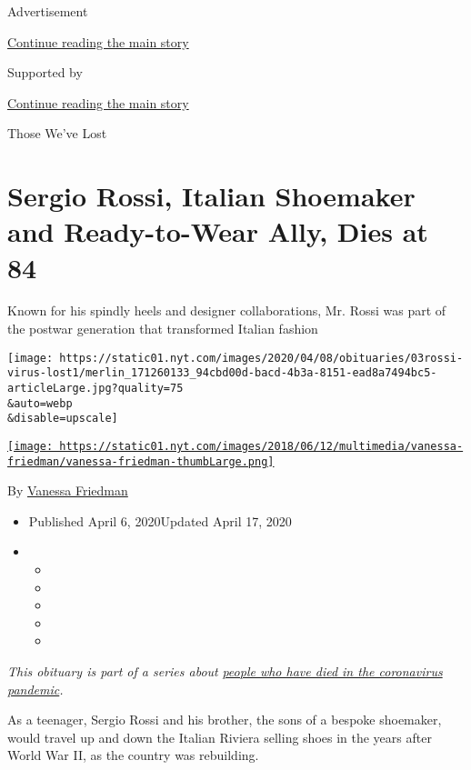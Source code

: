 Advertisement

\protect\hyperlink{after-top}{Continue reading the main story}

Supported by

\protect\hyperlink{after-sponsor}{Continue reading the main story}

Those We've Lost

\hypertarget{sergio-rossi-italian-shoemaker-and-ready-to-wear-ally-dies-at-84}{%
\section{Sergio Rossi, Italian Shoemaker and Ready-to-Wear Ally, Dies at
84}\label{sergio-rossi-italian-shoemaker-and-ready-to-wear-ally-dies-at-84}}

Known for his spindly heels and designer collaborations, Mr. Rossi was
part of the postwar generation that transformed Italian fashion

\texttt{[image: https://static01.nyt.com/images/2020/04/08/obituaries/03rossi-virus-lost1/merlin\_171260133\_94cbd00d-bacd-4b3a-8151-ead8a7494bc5-articleLarge.jpg?quality=75\\\&auto=webp\\\&disable=upscale]}

\href{https://www.nytimes.com/by/vanessa-friedman}{\texttt{[image: https://static01.nyt.com/images/2018/06/12/multimedia/vanessa-friedman/vanessa-friedman-thumbLarge.png]}}

By \href{https://www.nytimes.com/by/vanessa-friedman}{Vanessa Friedman}

\begin{itemize}
\item
  Published April 6, 2020Updated April 17, 2020
\item
  \begin{itemize}
  \item
  \item
  \item
  \item
  \item
  \end{itemize}
\end{itemize}

\emph{This obituary is part of a series about}
\href{https://www.nytimes.com/series/people-who-have-died-of-the-coronavirus}{\emph{people
who have died in the coronavirus pandemic}}\emph{.}

As a teenager, Sergio Rossi and his brother, the sons of a bespoke
shoemaker, would travel up and down the Italian Riviera selling shoes in
the years after World War II, as the country was rebuilding.

